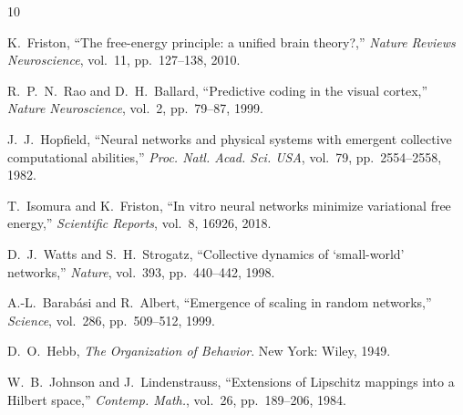 \documentclass[aps,prl,reprint]{revtex4-2}
\begin{document}
\begin{thebibliography}{10}

K.~Friston, ``The free-energy principle: a unified brain theory?,''
\textit{Nature Reviews Neuroscience}, vol.~11, pp.~127--138, 2010.

R.~P.~N.~Rao and D.~H.~Ballard, ``Predictive coding in the visual cortex,''
\textit{Nature Neuroscience}, vol.~2, pp.~79--87, 1999.

J.~J.~Hopfield, ``Neural networks and physical systems with emergent
collective computational abilities,''
\textit{Proc. Natl. Acad. Sci. USA}, vol.~79, pp.~2554--2558, 1982.

T.~Isomura and K.~Friston, ``In vitro neural networks minimize variational
free energy,'' \textit{Scientific Reports}, vol.~8, 16926, 2018.

D.~J.~Watts and S.~H.~Strogatz, ``Collective dynamics of `small-world'
networks,'' \textit{Nature}, vol.~393, pp.~440--442, 1998.

A.-L.~Barab\'{a}si and R.~Albert, ``Emergence of scaling in random
networks,'' \textit{Science}, vol.~286, pp.~509--512, 1999.

D.~O.~Hebb, \textit{The Organization of Behavior}. New York: Wiley, 1949.

W.~B.~Johnson and J.~Lindenstrauss, ``Extensions of Lipschitz mappings
into a Hilbert space,'' \textit{Contemp. Math.}, vol.~26, pp.~189--206,
1984.

\end{thebibliography}
\end{document}
